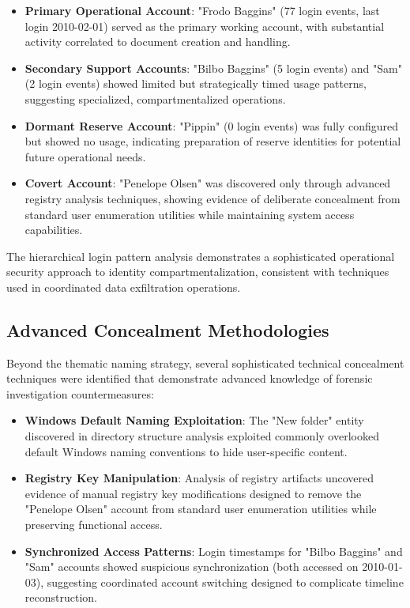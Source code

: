 \begin{itemize}
    \item \textbf{Primary Operational Account}: "Frodo Baggins" (77 login events, last login 2010-02-01) served as the primary working account, with substantial activity correlated to document creation and handling.
    
    \item \textbf{Secondary Support Accounts}: "Bilbo Baggins" (5 login events) and "Sam" (2 login events) showed limited but strategically timed usage patterns, suggesting specialized, compartmentalized operations.
    
    \item \textbf{Dormant Reserve Account}: "Pippin" (0 login events) was fully configured but showed no usage, indicating preparation of reserve identities for potential future operational needs.
    
    \item \textbf{Covert Account}: "Penelope Olsen" was discovered only through advanced registry analysis techniques, showing evidence of deliberate concealment from standard user enumeration utilities while maintaining system access capabilities.
\end{itemize}

The hierarchical login pattern analysis demonstrates a sophisticated operational security approach to identity compartmentalization, consistent with techniques used in coordinated data exfiltration operations.

\subsection{Advanced Concealment Methodologies}
Beyond the thematic naming strategy, several sophisticated technical concealment techniques were identified that demonstrate advanced knowledge of forensic investigation countermeasures:

\begin{itemize}
    \item \textbf{Windows Default Naming Exploitation}: The "New folder" entity discovered in directory structure analysis exploited commonly overlooked default Windows naming conventions to hide user-specific content.
    
    \item \textbf{Registry Key Manipulation}: Analysis of registry artifacts uncovered evidence of manual registry key modifications designed to remove the "Penelope Olsen" account from standard user enumeration utilities while preserving functional access.
    
    \item \textbf{Synchronized Access Patterns}: Login timestamps for "Bilbo Baggins" and "Sam" accounts showed suspicious synchronization (both accessed on 2010-01-03), suggesting coordinated account switching designed to complicate timeline reconstruction.
\end{itemize}

